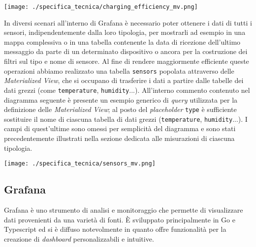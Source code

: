\begin{center}
	\texttt{[image: ./specifica\_tecnica/charging\_efficiency\_mv.png]}
\end{center}
In diversi scenari all'interno di Grafana è necessario poter ottenere i dati di tutti i sensori, indipendentemente dalla loro tipologia, per mostrarli ad esempio in una mappa
complessiva o in una tabella contenente la data di ricezione dell'ultimo messaggio da parte di un determinato dispositivo o ancora per la costruzione dei filtri sul tipo e nome di sensore.
Al fine di rendere maggiormente efficiente queste operazioni abbiamo realizzato una tabella \texttt{sensors} popolata attraverso delle \textit{Materialized View},
che si occupano di trasferire i dati a partire dalle tabelle dei dati grezzi (come \texttt{temperature}, \texttt{humidity}...).
All'interno commento contenuto nel diagramma seguente è presente un esempio generico di \textit{query} utilizzata per la definizione delle \textit{Materialized View}; al posto del \textit{placeholder}
\texttt{{type}} è sufficiente sostituire il nome di ciascuna tabella di dati grezzi (\texttt{temperature}, \texttt{humidity}...).
I campi di quest'ultime sono omessi per semplicità del diagramma e sono stati precedentemente illustrati nella sezione dedicata alle misurazioni di ciascuna tipologia.

\begin{center}
	\texttt{[image: ./specifica\_tecnica/sensors\_mv.png]}
\end{center}

\pagebreak
\subsection{Grafana}
Grafana è uno strumento di analisi e monitoraggio che permette di visualizzare dati provenienti da una varietà di fonti. È sviluppato principalmente in Go e Typescript ed si è diffuso notevolmente
in quanto offre funzionalità per la creazione di \textit{dashboard} personalizzabili e intuitive.
